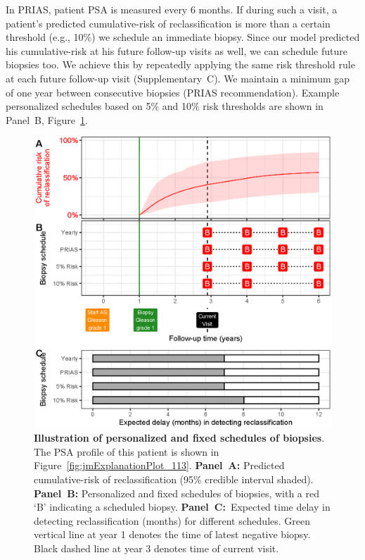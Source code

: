 In PRIAS, patient PSA is measured every 6 months. If during such a visit, a patient's predicted cumulative-risk of reclassification is more than a certain threshold (e.g., 10\%) we schedule an immediate biopsy. Since our model predicted his cumulative-risk at his future follow-up visits as well, we can schedule future biopsies too. We achieve this by repeatedly applying the same risk threshold rule at each future follow-up visit (Supplementary~C). We maintain a minimum gap of one year between consecutive biopsies (PRIAS recommendation). Example personalized schedules based on 5\% and 10\% risk thresholds are shown in Panel~B, Figure~\ref{fig:demo_pat1}.

\begin{figure}[!htb]
\centerline{\includegraphics[width=\columnwidth]{images/demo_pat1.eps}}
\caption{\textbf{Illustration of personalized and fixed schedules of biopsies}. The PSA profile of this patient is shown in Figure~\ref{fig:jmExplanationPlot_113}. \textbf{Panel~A:} Predicted cumulative-risk of reclassification (95\% credible interval shaded). \textbf{Panel~B:} Personalized and fixed schedules of biopsies, with a red `B' indicating a scheduled biopsy. \textbf{Panel~C:}\ Expected time delay in detecting reclassification (months) for different schedules. Green vertical line at year 1 denotes the time of latest negative biopsy. Black dashed line at year 3 denotes time of current visit.}
\label{fig:demo_pat1}
\end{figure}

